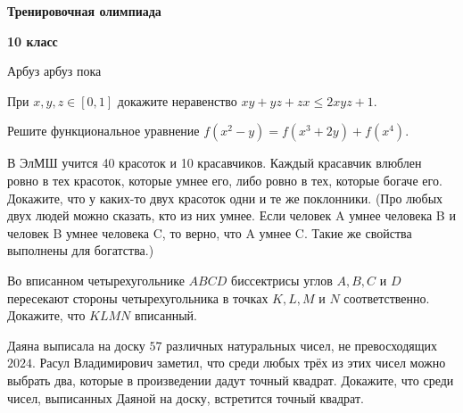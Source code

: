 \centerline{\bf \Huge Тренировочная олимпиада}
\centerline{\bf \Huge 10 класс}

\begin{flushright}
        \scriptsize{Арбуз арбуз пока}
\end{flushright}

При $x, y, z \in[0,1]$ докажите неравенство $x y+y z+z x \leqslant 2 x y z+1$.

Решите функциональное уравнение $f\left(x^2-y\right)=f\left(x^3+2 y\right)+f\left(x^4\right)$.

В ЭлМШ учится 40 красоток и 10 красавчиков. Каждый красавчик влюблен ровно в тех красоток, которые умнее его, либо ровно в тех, которые богаче его. Докажите, что у каких-то двух красоток одни и те же поклонники. (Про любых двух людей можно сказать, кто из них умнее. Если человек A умнее человека B и человек B умнее человека C, то верно, что A умнее C. Такие же свойства выполнены для богатства.)

Во вписанном четырехугольнике $ABCD$ биссектрисы углов $A, B, C$ и $D$ пересекают стороны четырехугольника в точках $K, L, M$ и $N$ соответственно. Докажите, что $KLMN$ вписанный.

Даяна выписала на доску $57$ различных натуральных чисел, не превосходящих
$2024$. Расул Владимирович заметил, что среди любых трёх из этих чисел можно выбрать два, которые в произведении дадут точный квадрат. Докажите, что среди чисел, выписанных Даяной на доску, встретится точный квадрат.
